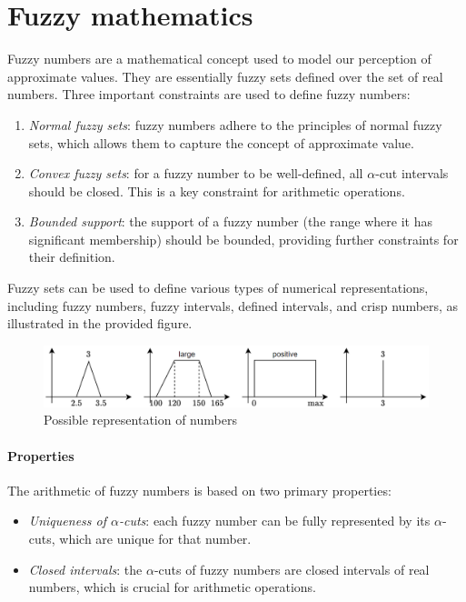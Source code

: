 \section{Fuzzy mathematics}

Fuzzy numbers are a mathematical concept used to model our perception of approximate values. 
They are essentially fuzzy sets defined over the set of real numbers. 
Three important constraints are used to define fuzzy numbers:
\begin{enumerate}
    \item \textit{Normal fuzzy sets}: fuzzy numbers adhere to the principles of normal fuzzy sets, which allows them to capture the concept of approximate value.
    \item \textit{Convex fuzzy sets}: for a fuzzy number to be well-defined, all $\alpha$-cut intervals should be closed. This is a key constraint for arithmetic operations.
    \item \textit{Bounded support}: the support of a fuzzy number (the range where it has significant membership) should be bounded, providing further constraints for their definition.
\end{enumerate}
Fuzzy sets can be used to define various types of numerical representations, including fuzzy numbers, fuzzy intervals, defined intervals, and crisp numbers, as illustrated in the provided figure.
\begin{figure}[H]
    \centering
    \includegraphics[width=0.75\linewidth]{images/numbers.png}
    \caption{Possible representation of numbers}
\end{figure}

\paragraph*{Properties}
The arithmetic of fuzzy numbers is based on two primary properties:
\begin{itemize}
    \item \textit{Uniqueness of $\alpha$-cuts}: each fuzzy number can be fully represented by its $\alpha$-cuts, which are unique for that number.
    \item \textit{Closed intervals}: the $\alpha$-cuts of fuzzy numbers are closed intervals of real numbers, which is crucial for arithmetic operations.
\end{itemize}

